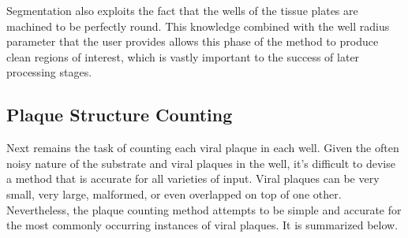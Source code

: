 \documentclass[11pt,final,twocolumn]{IEEEtran}
\begin{document}
Segmentation also exploits the fact that the wells of the tissue plates are machined to be perfectly round. This knowledge combined with the well radius parameter that the user provides allows this phase of the method to produce clean regions of interest, which is vastly important to the success of later processing stages.

\subsection{Plaque Structure Counting}
Next remains the task of counting each viral plaque in each well. Given the often noisy nature of the substrate and viral plaques in the well, it’s difficult to devise a method that is accurate for all varieties of input. Viral plaques can be very small, very large, malformed, or even overlapped on top of one other. Nevertheless, the plaque counting method attempts to be simple and accurate for the most commonly occurring instances of viral plaques. It is summarized below.  
\end{document}
